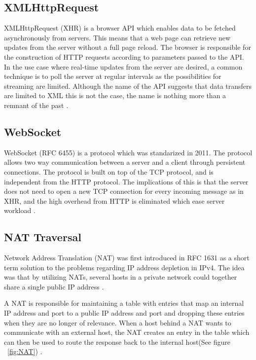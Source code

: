 \subsection{XMLHttpRequest}
XMLHttpRequest (XHR) is a browser API which enables data to be fetched asynchronously from servers. This means that a web page can retrieve new updates from the server without a full page reload. The browser is responsible for the construction of HTTP requests according to parameters passed to the API. In the use case where real-time updates from the server are desired, a common technique is to poll the server at regular intervals as the possibilities for streaming are limited. Although the name of the API suggests that data transfers are limited to XML this is not the case, the name is nothing more than a remnant of the past \cite{XHR:Online}.

\subsection{WebSocket}
WebSocket (RFC 6455) is a protocol which was standarized in 2011. The protocol allows two way communication between a server and a client through persistent connections. The protocol is built on top of the TCP protocol, and is independent from the HTTP protocol. The implications of this is that the server does not need to open a new TCP connection for every incoming message as in XHR, and the high overhead from HTTP is eliminated which ease server workload \cite{RFC6455:Online}.

\subsection{NAT Traversal}
Network Address Translation (NAT) was first introduced in RFC 1631 as a short term solution to the problems regarding IP address depletion in IPv4. The idea was that by utilizing NATs, several hosts in a private network could together share a single public IP address \cite{RFC1631:Online}.

A NAT is responsible for maintaining a table with entries that map an internal IP address and port to a public IP address and port and dropping these entries when they are no longer of relevance. When a host behind a NAT wants to communicate with an external host, the NAT creates an entry in the table which can then be used to route the response back to the internal host(See figure ~\ref{fig:NAT}) \cite{RFC5245:Online}.

